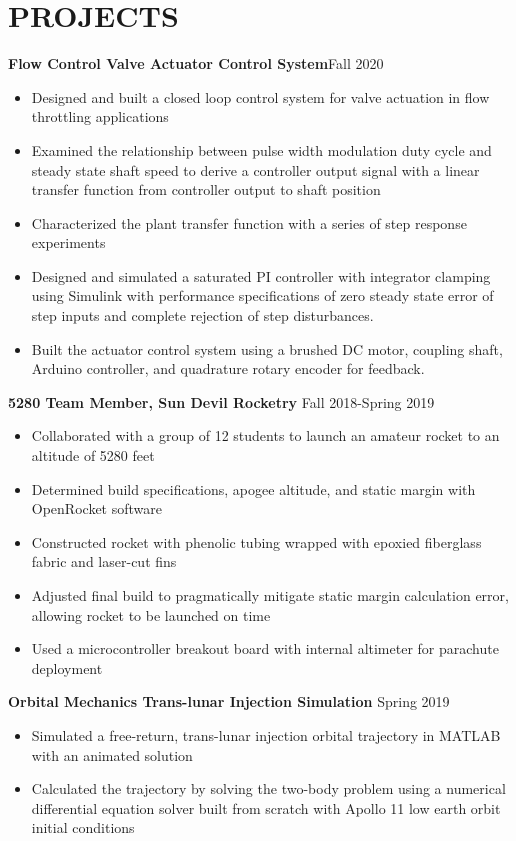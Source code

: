 \documentclass{article}
\begin{document}
\section{PROJECTS}
\textbf{Flow Control Valve Actuator Control System}\hfill Fall 2020
\vspace{0.5em}
\begin{itemize}
	\item Designed and built a closed loop control system for valve actuation in flow throttling applications
	\item Examined the relationship between pulse width modulation duty cycle and steady state shaft speed to derive a controller output signal with a linear transfer function from controller output to shaft position  
	\item Characterized the plant transfer function with a series of step response experiments
	\item  Designed and simulated a saturated PI controller with integrator clamping using Simulink with performance specifications of zero steady state error of step inputs and complete rejection of step disturbances.
	\item  Built the actuator control system using a brushed DC motor, coupling shaft, Arduino controller, and quadrature rotary encoder for feedback.
\end{itemize}
\vspace{0.5em}
\textbf{5280 Team Member, Sun Devil Rocketry}
\hfill Fall 2018-Spring 2019
\vspace{0.5em}
\begin{itemize}
	\item Collaborated with a group of 12 students to launch an amateur rocket to an altitude of 5280 feet
	\item Determined build specifications, apogee altitude, and static margin with OpenRocket software
	\item Constructed rocket with phenolic tubing wrapped with epoxied fiberglass fabric and laser-cut fins 
	\item Adjusted final build to pragmatically mitigate static margin calculation error, allowing rocket to be launched on time
	\item Used a microcontroller breakout board with internal altimeter for parachute deployment
\end{itemize}
\vspace{0.5em}
\textbf{Orbital Mechanics Trans-lunar Injection Simulation} 
\hfill
Spring 2019
\vspace{0.5em}
\begin{itemize}
	\item Simulated a free-return, trans-lunar injection orbital trajectory in MATLAB with an animated solution
	\item Calculated the trajectory by solving the two-body problem using a numerical differential equation solver built from scratch with Apollo 11 low earth orbit initial conditions
\end{itemize}

\thispagestyle{empty}
\end{document}
